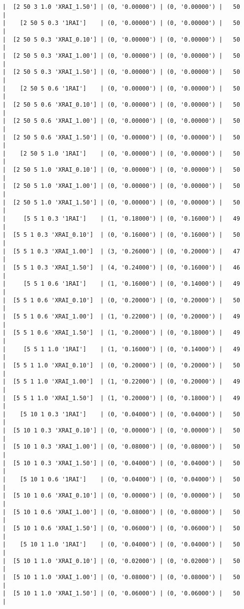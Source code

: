 \documentclass{article}
\begin{document}
\begin{verbatim}
|  [2 50 3 1.0 'XRAI_1.50'] | (0, '0.00000') | (0, '0.00000') |   50  |
|    [2 50 5 0.3 '1RAI']    | (0, '0.00000') | (0, '0.00000') |   50  |
|  [2 50 5 0.3 'XRAI_0.10'] | (0, '0.00000') | (0, '0.00000') |   50  |
|  [2 50 5 0.3 'XRAI_1.00'] | (0, '0.00000') | (0, '0.00000') |   50  |
|  [2 50 5 0.3 'XRAI_1.50'] | (0, '0.00000') | (0, '0.00000') |   50  |
|    [2 50 5 0.6 '1RAI']    | (0, '0.00000') | (0, '0.00000') |   50  |
|  [2 50 5 0.6 'XRAI_0.10'] | (0, '0.00000') | (0, '0.00000') |   50  |
|  [2 50 5 0.6 'XRAI_1.00'] | (0, '0.00000') | (0, '0.00000') |   50  |
|  [2 50 5 0.6 'XRAI_1.50'] | (0, '0.00000') | (0, '0.00000') |   50  |
|    [2 50 5 1.0 '1RAI']    | (0, '0.00000') | (0, '0.00000') |   50  |
|  [2 50 5 1.0 'XRAI_0.10'] | (0, '0.00000') | (0, '0.00000') |   50  |
|  [2 50 5 1.0 'XRAI_1.00'] | (0, '0.00000') | (0, '0.00000') |   50  |
|  [2 50 5 1.0 'XRAI_1.50'] | (0, '0.00000') | (0, '0.00000') |   50  |
|     [5 5 1 0.3 '1RAI']    | (1, '0.18000') | (0, '0.16000') |   49  |
|  [5 5 1 0.3 'XRAI_0.10']  | (0, '0.16000') | (0, '0.16000') |   50  |
|  [5 5 1 0.3 'XRAI_1.00']  | (3, '0.26000') | (0, '0.20000') |   47  |
|  [5 5 1 0.3 'XRAI_1.50']  | (4, '0.24000') | (0, '0.16000') |   46  |
|     [5 5 1 0.6 '1RAI']    | (1, '0.16000') | (0, '0.14000') |   49  |
|  [5 5 1 0.6 'XRAI_0.10']  | (0, '0.20000') | (0, '0.20000') |   50  |
|  [5 5 1 0.6 'XRAI_1.00']  | (1, '0.22000') | (0, '0.20000') |   49  |
|  [5 5 1 0.6 'XRAI_1.50']  | (1, '0.20000') | (0, '0.18000') |   49  |
|     [5 5 1 1.0 '1RAI']    | (1, '0.16000') | (0, '0.14000') |   49  |
|  [5 5 1 1.0 'XRAI_0.10']  | (0, '0.20000') | (0, '0.20000') |   50  |
|  [5 5 1 1.0 'XRAI_1.00']  | (1, '0.22000') | (0, '0.20000') |   49  |
|  [5 5 1 1.0 'XRAI_1.50']  | (1, '0.20000') | (0, '0.18000') |   49  |
|    [5 10 1 0.3 '1RAI']    | (0, '0.04000') | (0, '0.04000') |   50  |
|  [5 10 1 0.3 'XRAI_0.10'] | (0, '0.00000') | (0, '0.00000') |   50  |
|  [5 10 1 0.3 'XRAI_1.00'] | (0, '0.08000') | (0, '0.08000') |   50  |
|  [5 10 1 0.3 'XRAI_1.50'] | (0, '0.04000') | (0, '0.04000') |   50  |
|    [5 10 1 0.6 '1RAI']    | (0, '0.04000') | (0, '0.04000') |   50  |
|  [5 10 1 0.6 'XRAI_0.10'] | (0, '0.00000') | (0, '0.00000') |   50  |
|  [5 10 1 0.6 'XRAI_1.00'] | (0, '0.08000') | (0, '0.08000') |   50  |
|  [5 10 1 0.6 'XRAI_1.50'] | (0, '0.06000') | (0, '0.06000') |   50  |
|    [5 10 1 1.0 '1RAI']    | (0, '0.04000') | (0, '0.04000') |   50  |
|  [5 10 1 1.0 'XRAI_0.10'] | (0, '0.02000') | (0, '0.02000') |   50  |
|  [5 10 1 1.0 'XRAI_1.00'] | (0, '0.08000') | (0, '0.08000') |   50  |
|  [5 10 1 1.0 'XRAI_1.50'] | (0, '0.06000') | (0, '0.06000') |   50  |

\end{verbatim}
\end{document}
